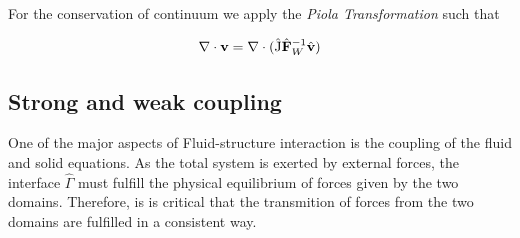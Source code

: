 For the conservation of continuum we apply the \textit{Piola Transformation} such that

\begin{align*}
\nabla \cdot \mathbf{v} = \nabla \cdot (\ha{J} \hat{F}_W^{-1} \hat{v})
\end{align*}

\subsection*{Strong and weak coupling }
One of the major aspects of Fluid-structure interaction is the coupling of the fluid and solid equations.  As the total system is exerted by external forces, the interface $\hat{\Gamma}$ must fulfill the physical equilibrium of forces given by the two domains. Therefore, is is critical that the transmition of forces from the two domains are fulfilled in a consistent way.

